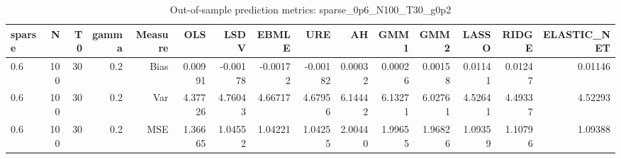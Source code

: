 \begin{table}[!htbp]\centering
\caption{Out-of-sample prediction metrics: sparse_0p6_N100_T30_g0p2}
\label{tab:table3_sparse_0p6_N100_T30_g0p2}
\begin{tabular}{lrrrrrrrrrrrrrr}
\hline
sparse & N & T0 & gamma & Measure & OLS & LSDV & EBMLE & URE & AH & GMM1 & GMM2 & LASSO & RIDGE & ELASTIC_NET \\
\hline
0.6 & 100 & 30 & 0.2 & Bias & 0.00991 & -0.00178 & -0.00172 & -0.00182 & 0.00032 & 0.00026 & 0.00158 & 0.01141 & 0.01247 & 0.01146 \\
0.6 & 100 & 30 & 0.2 & Var & 4.37726 & 4.76043 & 4.66717 & 4.67956 & 6.14442 & 6.13271 & 6.02761 & 4.52641 & 4.49337 & 4.52293 \\
0.6 & 100 & 30 & 0.2 & MSE & 1.36665 & 1.04552 & 1.04221 & 1.04255 & 2.00440 & 1.99655 & 1.96826 & 1.09359 & 1.10796 & 1.09388 \\
\hline
\end{tabular}
\end{table}

